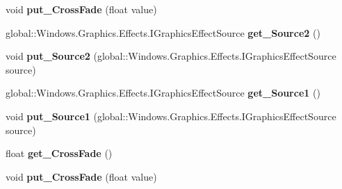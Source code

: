 \begin{DoxyCompactItemize}
void {\bfseries put\+\_\+\+Cross\+Fade} (float value)
\item 
\mbox{\label{interface_microsoft_1_1_graphics_1_1_canvas_1_1_effects_1_1_i_cross_fade_effect_aa4046ab138ef0fb93560d9f74875b5fb}} 
global\+::\+Windows.\+Graphics.\+Effects.\+I\+Graphics\+Effect\+Source {\bfseries get\+\_\+\+Source2} ()
\item 
\mbox{\label{interface_microsoft_1_1_graphics_1_1_canvas_1_1_effects_1_1_i_cross_fade_effect_ae9a7ddede25c924649cded934e81b457}} 
void {\bfseries put\+\_\+\+Source2} (global\+::\+Windows.\+Graphics.\+Effects.\+I\+Graphics\+Effect\+Source source)
\item 
\mbox{\label{interface_microsoft_1_1_graphics_1_1_canvas_1_1_effects_1_1_i_cross_fade_effect_a6cf8a47d6e17902e59cbfba37f8bc6d4}} 
global\+::\+Windows.\+Graphics.\+Effects.\+I\+Graphics\+Effect\+Source {\bfseries get\+\_\+\+Source1} ()
\item 
\mbox{\label{interface_microsoft_1_1_graphics_1_1_canvas_1_1_effects_1_1_i_cross_fade_effect_aa61455b872f1f3db557618ac68112384}} 
void {\bfseries put\+\_\+\+Source1} (global\+::\+Windows.\+Graphics.\+Effects.\+I\+Graphics\+Effect\+Source source)
\item 
\mbox{\label{interface_microsoft_1_1_graphics_1_1_canvas_1_1_effects_1_1_i_cross_fade_effect_af6d5c5f211f2a0d5dcebe870e4d0faa4}} 
float {\bfseries get\+\_\+\+Cross\+Fade} ()
\item 
\mbox{\label{interface_microsoft_1_1_graphics_1_1_canvas_1_1_effects_1_1_i_cross_fade_effect_a77159b902468d05e9b4edbd38789bea7}} 
void {\bfseries put\+\_\+\+Cross\+Fade} (float value)
\item 
\mbox{\label{interface_microsoft_1_1_graphics_1_1_canvas_1_1_effects_1_1_i_cross_fade_effect_aa4046ab138ef0fb93560d9f74875b5fb}} 

\end{DoxyCompactItemize}
